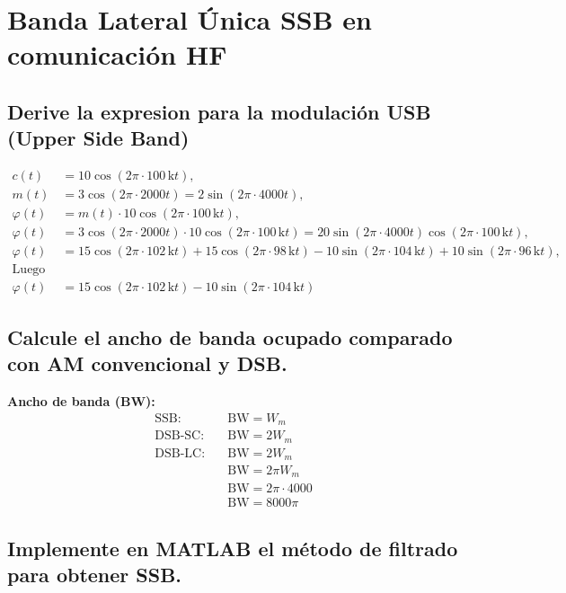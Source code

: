 \documentclass[conference]{IEEEtran}
\begin{document}
	\section{Banda Lateral Única SSB en comunicación HF}
	
	\subsection{Derive la expresion para la modulación USB (Upper Side Band)}
	\begin{align*}
		c(t) &= 10 \cos(2\pi \cdot 100\,\text{k} t), \\
		m(t) &= 3 \cos(2\pi \cdot 2000t) = 2 \sin(2\pi \cdot 4000t), \\
		\varphi(t) &= m(t) \cdot 10 \cos(2\pi \cdot 100\,\text{k} t), \\
		\varphi(t) &= 3 \cos(2\pi \cdot 2000t) \cdot 10 \cos(2\pi \cdot 100\,\text{k} t) 
		= 20 \sin(2\pi \cdot 4000t) \cos(2\pi \cdot 100\,\text{k} t), \\
		\varphi(t) &= 15 \cos(2\pi \cdot 102\,\text{k} t) + 15 \cos(2\pi \cdot 98\,\text{k} t) 
		- 10 \sin(2\pi \cdot 104\,\text{k} t) + 10 \sin(2\pi \cdot 96\,\text{k} t), \\
		\text{Luego del filtro se tendrá:} \\
		\varphi(t) &= 15 \cos(2\pi \cdot 102\,\text{k} t) - 10 \sin(2\pi \cdot 104\,\text{k} t)
	\end{align*}
	\subsection{Calcule el ancho de banda ocupado comparado con AM convencional y DSB.}
	\textbf{Ancho de banda (BW):}
	\begin{align*}
		\text{SSB:} &\quad \text{BW} = W_m \\
		\text{DSB-SC:} &\quad \text{BW} = 2W_m \\
		\text{DSB-LC:} &\quad \text{BW} = 2W_m \\
		&\quad \text{BW} = 2\pi W_m \\
		&\quad \text{BW} = 2\pi \cdot 4000 \\
		&\quad \text{BW} = 8000\pi
	\end{align*}
	\subsection{Implemente en MATLAB el método de filtrado para obtener SSB.}
	
\end{document}
